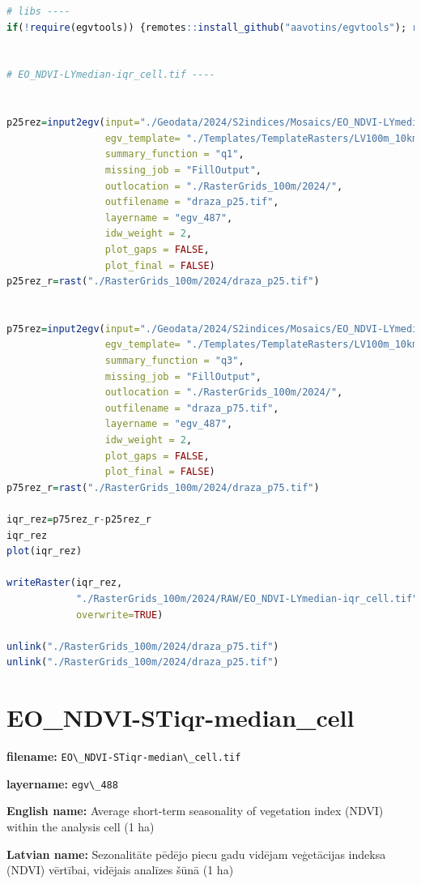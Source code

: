 \documentclass[
]{book}
\newcommand{\passthrough}[1]{#1}
\begin{document}
\begin{lstlisting}[language=R]
# libs ----
if(!require(egvtools)) {remotes::install_github("aavotins/egvtools"); require(egvtools)}


# EO_NDVI-LYmedian-iqr_cell.tif ----


p25rez=input2egv(input="./Geodata/2024/S2indices/Mosaics/EO_NDVI-LYmedian.tif",
                 egv_template= "./Templates/TemplateRasters/LV100m_10km.tif",
                 summary_function = "q1",
                 missing_job = "FillOutput",
                 outlocation = "./RasterGrids_100m/2024/",
                 outfilename = "draza_p25.tif",
                 layername = "egv_487",
                 idw_weight = 2,
                 plot_gaps = FALSE,
                 plot_final = FALSE)
p25rez_r=rast("./RasterGrids_100m/2024/draza_p25.tif")


p75rez=input2egv(input="./Geodata/2024/S2indices/Mosaics/EO_NDVI-LYmedian.tif",
                 egv_template= "./Templates/TemplateRasters/LV100m_10km.tif",
                 summary_function = "q3",
                 missing_job = "FillOutput",
                 outlocation = "./RasterGrids_100m/2024/",
                 outfilename = "draza_p75.tif",
                 layername = "egv_487",
                 idw_weight = 2,
                 plot_gaps = FALSE,
                 plot_final = FALSE)
p75rez_r=rast("./RasterGrids_100m/2024/draza_p75.tif")

iqr_rez=p75rez_r-p25rez_r
iqr_rez
plot(iqr_rez)

writeRaster(iqr_rez,
            "./RasterGrids_100m/2024/RAW/EO_NDVI-LYmedian-iqr_cell.tif",
            overwrite=TRUE)

unlink("./RasterGrids_100m/2024/draza_p75.tif")
unlink("./RasterGrids_100m/2024/draza_p25.tif")
\end{lstlisting}

\section{EO\_NDVI-STiqr-median\_cell}\label{ch06.488}

\textbf{filename:} \passthrough{\lstinline!EO\_NDVI-STiqr-median\_cell.tif!}

\textbf{layername:} \passthrough{\lstinline!egv\_488!}

\textbf{English name:} Average short-term seasonality of vegetation index (NDVI) within the analysis cell (1 ha)

\textbf{Latvian name:} Sezonalitāte pēdējo piecu gadu vidējam veģetācijas indeksa (NDVI) vērtībai, vidējais analīzes šūnā (1 ha)
\end{document}

